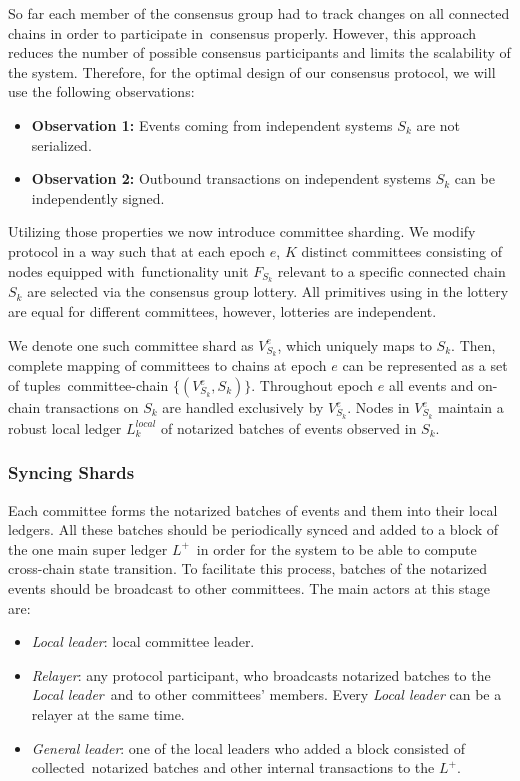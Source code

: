 So far each member of the consensus group had to track changes on all connected chains in order to participate in\
consensus properly.
However, this approach reduces the number of possible consensus participants and limits the scalability of the system.
Therefore, for the optimal design of our consensus protocol, we will use the following observations:
\begin{itemize}
    \item \textbf{Observation 1:} Events coming from independent systems $S_k$ are not serialized.
    \item \textbf{Observation 2:} Outbound transactions on independent systems $S_k$ can be independently signed.
\end{itemize}

Utilizing those properties we now introduce committee sharding.
We modify protocol in a way such that at each epoch $e$, $K$ distinct committees consisting of nodes equipped with\
functionality unit $F_{S_k}$ relevant to a specific connected chain $S_k$ are selected via the consensus group lottery.
All primitives using in the lottery are equal for different committees, however, lotteries are independent.

We denote one such committee shard as $V^{e}_{S_k}$, which uniquely maps to $S_k$.
Then, complete mapping of committees to chains at epoch $e$ can be represented as a set of tuples\
committee-chain $\{(V^{e}_{S_k}, S_k)\}$.
Throughout epoch $e$ all events and on-chain transactions on $S_k$ are handled exclusively by $V^{e}_{S_k}$.
Nodes in $V^{e}_{S_k}$ maintain a robust local ledger $L^{local}_k$ of notarized batches of events observed in $S_k$.

\subsubsection{Syncing Shards}

Each committee forms the notarized batches of events and them into their local ledgers.
All these batches should be periodically synced and added to a block of the one main super ledger $L^+$\
in order for the system to be able to compute cross-chain state transition.
To facilitate this process, batches of the notarized events should be broadcast to other committees.
The main actors at this stage are:
\begin{itemize}
    \item \emph{Local leader}: local committee leader.
    \item \emph{Relayer}: any protocol participant, who broadcasts notarized batches to the \emph{Local leader}\
    and to other committees' members.
    Every \emph{Local leader} can be a relayer at the same time.
    \item \emph{General leader}: one of the local leaders who added a block consisted of collected\
    notarized batches and other internal transactions to the $L^+$.
\end{itemize}

